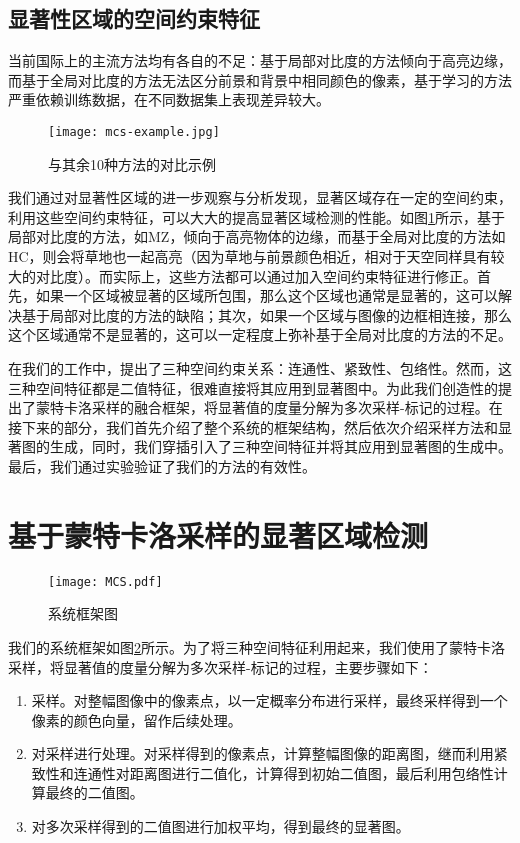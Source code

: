 \subsection{显著性区域的空间约束特征}
当前国际上的主流方法均有各自的不足：基于局部对比度的方法倾向于高亮边缘，而基于全局对比度的方法无法区分前景和背景中相同颜色的像素，基于学习的方法严重依赖训练数据，在不同数据集上表现差异较大。

\begin{figure}
\centering
\texttt{[image: mcs-example.jpg]}
\caption{与其余10种方法的对比示例}\label{fig:mcs_comp}
\end{figure}

我们通过对显著性区域的进一步观察与分析发现，显著区域存在一定的空间约束，利用这些空间约束特征，可以大大的提高显著区域检测的性能。如图\ref{fig:mcs_comp}所示，基于局部对比度的方法，如MZ\cite{ma2003contrast}，倾向于高亮物体的边缘，而基于全局对比度的方法如HC\cite{cheng2011global}，则会将草地也一起高亮（因为草地与前景颜色相近，相对于天空同样具有较大的对比度）。而实际上，这些方法都可以通过加入空间约束特征进行修正。首先，如果一个区域被显著的区域所包围，那么这个区域也通常是显著的，这可以解决基于局部对比度的方法的缺陷；其次，如果一个区域与图像的边框相连接，那么这个区域通常不是显著的，这可以一定程度上弥补基于全局对比度的方法的不足。

在我们的工作中，提出了三种空间约束关系：连通性、紧致性、包络性。然而，这三种空间特征都是二值特征，很难直接将其应用到显著图中。为此我们创造性的提出了蒙特卡洛采样的融合框架，将显著值的度量分解为多次采样-标记的过程。在接下来的部分，我们首先介绍了整个系统的框架结构，然后依次介绍采样方法和显著图的生成，同时，我们穿插引入了三种空间特征并将其应用到显著图的生成中。最后，我们通过实验验证了我们的方法的有效性。

\section{基于蒙特卡洛采样的显著区域检测}
\begin{figure}
\centering
\texttt{[image: MCS.pdf]}
\caption{系统框架图}\label{fig:mcs}
\end{figure}

我们的系统框架如图\ref{fig:mcs}所示。为了将三种空间特征利用起来，我们使用了蒙特卡洛采样，将显著值的度量分解为多次采样-标记的过程，主要步骤如下：
\begin{enumerate}
\item 采样。对整幅图像中的像素点，以一定概率分布进行采样，最终采样得到一个像素的颜色向量，留作后续处理。
\item 对采样进行处理。对采样得到的像素点，计算整幅图像的距离图，继而利用紧致性和连通性对距离图进行二值化，计算得到初始二值图，最后利用包络性计算最终的二值图。
\item 对多次采样得到的二值图进行加权平均，得到最终的显著图。
\end{enumerate}

